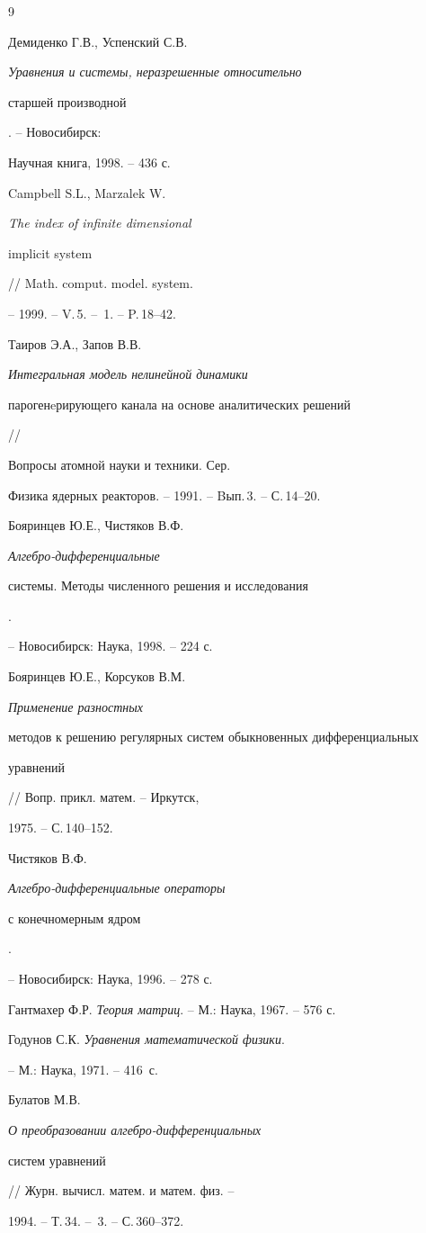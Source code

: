\begin{thebibliography}{9}







Демиденко Г.В., Успенский С.В.


{\em Уравнения и системы, неразрешенные относительно


старшей производной}. -- Новосибирск:


Научная книга, 1998. -- 436 с.




Campbell S.L., Marzalek W. {\em The index of infinite dimensional


implicit system} // Math. comput. model. system.


-- 1999. -- V.\,5. -- \No\,1. -- P.\,18--42.




Таиров Э.А., Запов В.В. {\em Интегральная модель нелинейной динамики 


парогенeрирующего канала на основе аналитических решений} //


Вопросы атомной науки и техники. Сер. 


Физика ядерных реакторов. -- 1991. -- Bып.\,3. -- С.\,14--20.




Бояринцев Ю.Е., Чистяков В.Ф. {\em Алгебро-дифференциальные


системы. Методы численного решения и исследования}.


-- Новосибирск: Наука, 1998. -- 224 с.




Бояринцев Ю.Е., Корсуков В.М. {\em Применение разностных


методов к решению регулярных систем обыкновенных дифференциальных


уравнений} // Вопр. прикл. матем. -- Иркутск,


1975. -- С.\,140--152.




Чистяков В.Ф. {\em Алгебро-дифференциальные операторы


с конечномерным ядром}.


-- Новосибирск: Наука, 1996. -- 278 с.




Гантмахер Ф.Р. {\em Теория матриц}. -- М.: Наука, 1967. -- 576 с.




Годунов С.К. {\em Уравнения математической физики}.


-- М.: Наука, 1971. -- 416~с.




Булатов М.В. {\em О преобразовании алгебро-дифференциальных


систем уравнений} // Журн. вычисл. матем. и матем. физ. --


1994. -- Т.\,34. -- \No\,3. -- С.\,360--372.





\end{thebibliography}





